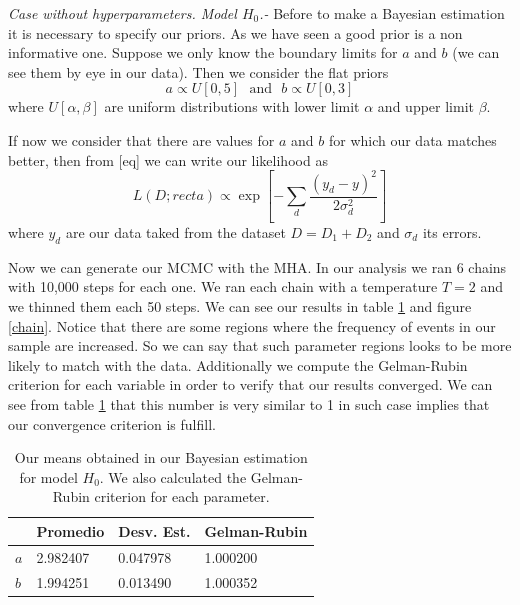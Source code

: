 \documentclass[onecolumn,           %
               showpacs,            %
               preprintnumbers,     %
               aps,                 %
               prl,          	    %
               letterpaper,             %
               superscriptaddress,      %
               nofootinbib,         %
               tightenlines,        %
               floats,floatfix      %
               ,usenatbib,
               ]{revtex4-1}
\begin{document}
\textit{Case without hyperparameters. Model $H_0$.-} Before to make a Bayesian estimation it is necessary to specify our priors. As we have seen a good prior is a non informative one. Suppose we only know the boundary limits for $a$ and $b$ (we can see them by eye in our data). Then we consider the flat priors
\begin{equation}
a \propto U[0,5] \ \ \ \text{and} \ \ \ b \propto U[0,3]
\end{equation}
where $U[\alpha,\beta]$ are uniform distributions with lower limit $\alpha$ and upper limit $\beta$.

If now we consider that there are values for $a$ and $b$ for which our data matches better, then from [eq] we can write our likelihood as
\begin{equation}
L(D;recta)\propto \exp\left[-\sum_d \frac{(y_d-y)^2}{2\sigma_d^2}\right]
\end{equation}
where $y_d$ are our data taked from the dataset $D=D_1+D_2$ and $\sigma_d$ its errors.

Now we can generate our MCMC with the MHA. In our analysis we ran 6 chains with 10,000 steps for each one. We ran each chain with a temperature $T=2$ and we thinned them each 50 steps. We can see our results in table \ref{tabla1} and figure \ref{chain}. Notice that there are some regions where the frequency of events in our sample are increased. So we can say that such parameter regions looks to be more likely to match with the data. Additionally we compute the Gelman-Rubin criterion for each variable in order to verify that our results converged. We can see from table \ref{tabla1} that this number is very similar to 1 in such case  implies that our convergence criterion is fulfill.

\begin{table}[h!]
\centering
\begin{tabular}{||l|l|l|l||} 
 \hline
 & \textbf{Promedio} & \textbf{Desv. Est.} & \textbf{Gelman-Rubin} \\ [0.5ex] 
 \hline\hline
$a$ & 2.982407 & 0.047978 & 1.000200 \\
\hline
$b$ & 1.994251 & 0.013490 & 1.000352\\ [1ex] 
 \hline
\end{tabular}
\caption{\footnotesize{Our means obtained in our Bayesian estimation for model $H_0$. We also calculated the Gelman-Rubin criterion for each parameter.}}
\label{tabla1}
\end{table}
\end{document}
